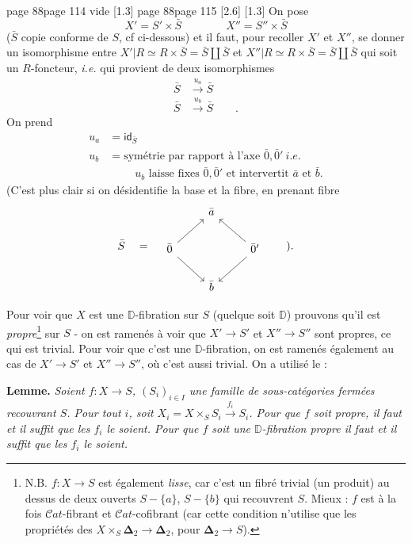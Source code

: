 \documentclass[11pt,leqno]{article}
\newcommand{\msp}[1]{%
  \begingroup\def\thismsp{#1}\def\blankmsp{page 114 vide}%
  \ifx\thismsp\blankmsp
    \marginnote{\scriptsize\sffamily [114: vide]}[1.3\baselineskip]%
  \else\def\followingmsp{page 115}%
    \ifx\thismsp\followingmsp
      \marginnote{\scriptsize\sffamily [page 115]}[2.6\baselineskip]%
    \else\marginnote{\scriptsize\sffamily [#1]}[1.3\baselineskip]\fi
  \fi\endgroup}
\newcommand{\D}{\ensuremath{\mathbb{D}}}
\newcommand{\Cat}{\ensuremath{\mathcal{C}at}}
\begin{document}
\msp{page 88}
On pose
\[ X' = S' \times \bar S \qquad\qquad X'' = S'' \times \bar S \]
($\bar S$ copie conforme de $S$, cf ci-dessous) et il faut, pour recoller $X'$ et $X''$, se donner un isomorphisme entre $X'|R \simeq R \times \bar S = \bar S \amalg \bar S$ et $X''|R \simeq R \times \bar S = \bar S \amalg \bar S$ qui soit un $R$-foncteur, \textit{i.e.} qui provient de deux isomorphismes
\[
\begin{aligned}
\bar S &\xrightarrow{u_a} \bar S \\
\bar S &\xrightarrow{u_b} \bar S \qquad .
\end{aligned}
\]
On prend
\[
\begin{aligned}
u_a &= \mathsf{id}_{\bar S} \\
u_b &= \text{symétrie par rapport à l'axe } \bar 0, \bar 0' \ \textit{i.e.} %
\\
&\phantom{=}\quad u_b \text{ laisse fixes } \bar 0, \bar 0' \text{ et intervertit } \bar a \text{ et } \bar b.
\end{aligned}
\]
(C'est plus clair si on désidentifie la base et la fibre, en prenant fibre
\[
\bar S \quad = \quad
\begin{tikzcd}
 & \bar a & \\
\bar 0 \arrow[ur] \arrow[dr] & & \bar 0' \arrow[ul] \arrow[dl] \\
 & \bar b &
\end{tikzcd}
\qquad ).
\]

Pour voir que $X$ est une $\D$-fibration sur $S$ (quelque soit $\D$) prouvons qu'il est \textit{propre}\footnote[45]{N.B. $f : X \to S$ est également \textit{lisse}, car c'est un fibré trivial (un produit) au dessus de deux ouverts $S - \{a\}$, $S - \{b\}$ qui recouvrent $S$. Mieux : $f$ est à la fois $\Cat$-fibrant et $\Cat$-cofibrant (car cette condition n'utilise que les propriétés des $X \times_S \boldsymbol{\Delta}_2 \to \boldsymbol{\Delta}_2$, pour $\boldsymbol{\Delta}_2 \to S$).} sur $S$ - on est ramenés à voir que $X' \to S'$ et $X'' \to S''$ sont propres, ce qui est trivial. Pour voir que c'est une $\D$-fibration, on est ramenés également au cas de $X' \to S'$ et $X'' \to S''$, où c'est aussi trivial. On a utilisé le : %

\textbf{Lemme.} \textit{Soient $f : X \to S$, $(S_i)_{i \in I}$ une famille de sous-catégories fermées recouvrant $S$. Pour tout $i$, soit $X_i = X \times_S S_i \xrightarrow{f_i} S_i$. Pour que $f$ soit propre, il faut et il suffit que les $f_i$ le soient. Pour que $f$ soit une $\D$-fibration propre il faut et il suffit que les $f_i$ le soient.}
\end{document}
